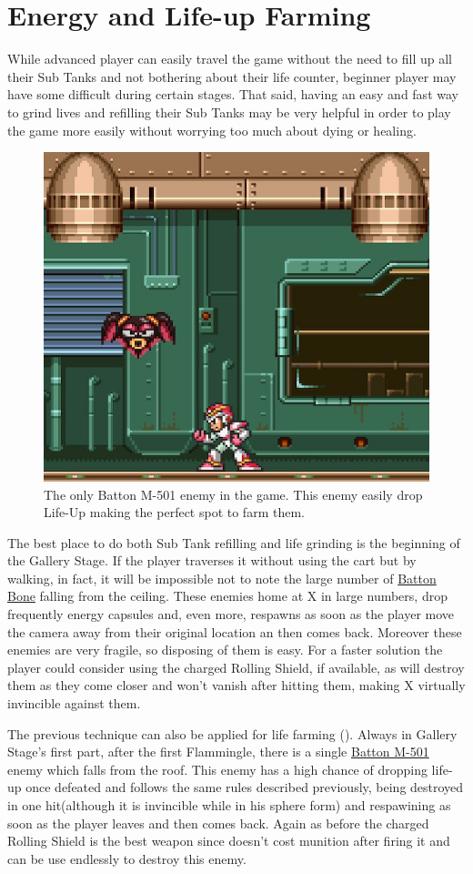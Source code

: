 \section{Energy and Life-up Farming}
While advanced player can easily travel the game without the need to fill up all their Sub Tanks and not bothering about their life counter, beginner player may have some difficult during certain stages. That said, having an easy and fast way to grind lives and refilling their Sub Tanks may be very helpful in order to play the game more easily without worrying too much about dying or healing.
\begin{figure}[htp]
	\centering
	\includegraphics[width=0.5\linewidth]{figures/X1/Miscs/Farming_spot.jpg}
	\caption{The only Batton M-501 enemy in the game. This enemy easily drop Life-Up making the perfect spot to farm them.}
\end{figure}
The best place to do both Sub Tank refilling and life grinding is the beginning of the Gallery Stage. If the player traverses it without using the cart but by walking, in fact, it will be impossible not to note the large number of \hyperlink{enem:Batton_Bone}{Batton Bone}  falling from the ceiling. These enemies home at X in large numbers, drop frequently energy capsules and, even more, respawns as soon as the player move the camera away from their original location an then comes back. Moreover these enemies are very fragile, so disposing of them is easy. For a faster solution the player could consider using the charged Rolling Shield, if available, as will destroy them as they come closer and won't vanish after hitting them, making X virtually invincible against them.

The previous technique can also be applied for life farming (). Always in Gallery Stage's first part, after the first Flammingle, there is a single \hyperlink{enem:Batton_M-501}{Batton M-501}  enemy which falls from the roof. This enemy has a high chance of dropping life-up once defeated and follows the same rules described previously, being destroyed in one hit(although it is invincible while in his sphere form) and respawining as soon as the player leaves and then comes back. Again as before the charged Rolling Shield is the best weapon since doesn't cost munition after firing it and can be use endlessly to destroy this enemy.

